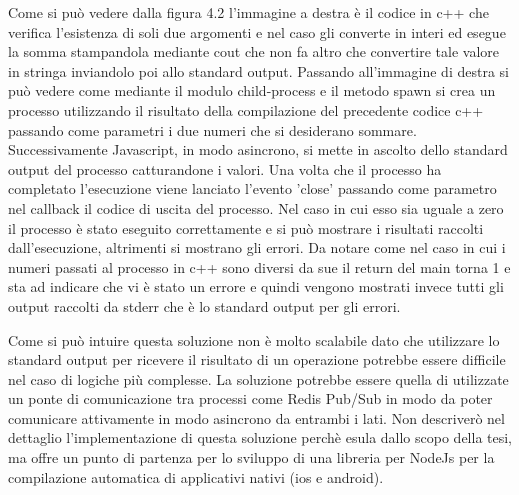\vspace{5mm}Come si può vedere dalla figura 4.2 l'immagine a destra è il codice in c++ che verifica l'esistenza di soli due argomenti e nel caso gli converte in interi ed esegue la somma stampandola mediante cout che non fa altro che convertire tale valore in stringa inviandolo poi allo standard output. Passando all'immagine di destra si può vedere come mediante il modulo child-process e il metodo spawn si crea un processo utilizzando il risultato della compilazione del precedente codice c++ passando come parametri i due numeri che si desiderano sommare. Successivamente Javascript, in modo asincrono, si mette in ascolto dello standard output del processo catturandone i valori. Una volta che il processo ha completato l'esecuzione viene lanciato l'evento 'close' passando come parametro nel callback il codice di uscita del processo. Nel caso in cui esso sia uguale a zero il processo è stato eseguito correttamente e si può mostrare i risultati raccolti dall'esecuzione, altrimenti si mostrano gli errori. Da notare come nel caso in cui i numeri passati al processo in c++ sono diversi da sue il return del main torna 1 e sta ad indicare che vi è stato un errore e quindi vengono mostrati invece tutti gli output raccolti da stderr che è lo standard output per gli errori.

\vspace{5mm}Come si può intuire questa soluzione non è molto scalabile dato che utilizzare lo standard output per ricevere il risultato di un operazione potrebbe essere difficile nel caso di logiche più complesse. La soluzione potrebbe essere quella di utilizzate un ponte di comunicazione tra processi come Redis Pub/Sub \cite{PubSubRedis} in modo da poter comunicare attivamente in modo asincrono da entrambi i lati. Non descriverò nel dettaglio l'implementazione di questa soluzione perchè esula dallo scopo della tesi, ma offre un punto di partenza per lo sviluppo di una libreria per NodeJs per la compilazione automatica di applicativi nativi (ios e android).









